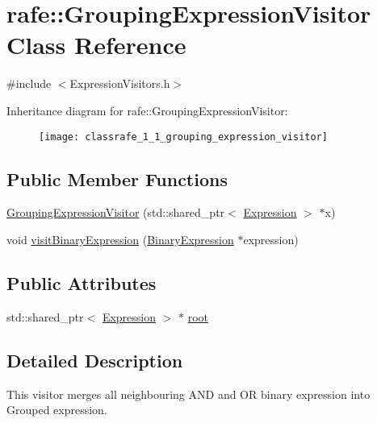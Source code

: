 \hypertarget{classrafe_1_1_grouping_expression_visitor}{\section{rafe\+:\+:Grouping\+Expression\+Visitor Class Reference}
\label{classrafe_1_1_grouping_expression_visitor}
}


{\ttfamily \#include $<$Expression\+Visitors.\+h$>$}

Inheritance diagram for rafe\+:\+:Grouping\+Expression\+Visitor\+:\begin{figure}[H]
\begin{center}
\leavevmode
\texttt{[image: classrafe\_1\_1\_grouping\_expression\_visitor]}
\end{center}
\end{figure}
\subsection*{Public Member Functions}
\begin{DoxyCompactItemize}
\item 
\hyperlink{classrafe_1_1_grouping_expression_visitor_ae171337286854c9bd3c3c5eb73c465c7}{Grouping\+Expression\+Visitor} (std\+::shared\+\_\+ptr$<$ \hyperlink{classrafe_1_1_expression}{Expression} $>$ $\ast$x)
\item 
void \hyperlink{classrafe_1_1_grouping_expression_visitor_a5ef6febb7f733f4adcf61bc83a6d10f8}{visit\+Binary\+Expression} (\hyperlink{classrafe_1_1_binary_expression}{Binary\+Expression} $\ast$expression)
\end{DoxyCompactItemize}
\subsection*{Public Attributes}
\begin{DoxyCompactItemize}
\item 
std\+::shared\+\_\+ptr$<$ \hyperlink{classrafe_1_1_expression}{Expression} $>$ $\ast$ \hyperlink{classrafe_1_1_grouping_expression_visitor_a95a43ca2fdb2670f5407d7b38fff1e9e}{root}
\end{DoxyCompactItemize}


\subsection{Detailed Description}
This visitor merges all neighbouring A\+N\+D and O\+R binary expression into Grouped expression. 

